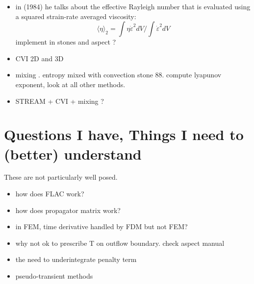 \documentclass[a4paper]{article}
\begin{document}
\begin{itemize}
\item in \textcite{chri84} (1984) he talks about the effective Rayleigh number 
that is evaluated using a squared strain-rate averaged viscosity:
\[
\langle \eta \rangle_2 = \int \eta \dot{\varepsilon}^2 dV/\int \dot{\varepsilon}^2 dV
\]
implement in stones and aspect ?

\item CVI 2D and 3D

\item mixing . entropy mixed with convection stone 88. compute lyapunov exponent, look at all other methods.

\item STREAM + CVI + mixing ?

\end{itemize}

\newpage
\section{Questions I have, Things I need to (better) understand}

These are not particularly well posed. 

\begin{itemize}
\item how does FLAC work?
\item how does propagator matrix work?
\item in FEM, time derivative handled by FDM but not FEM?
\item why not ok to prescribe T on outflow boundary. check aspect manual
\item the need to underintegrate penalty term
\item pseudo-transient methods
\end{itemize}
\end{document}
